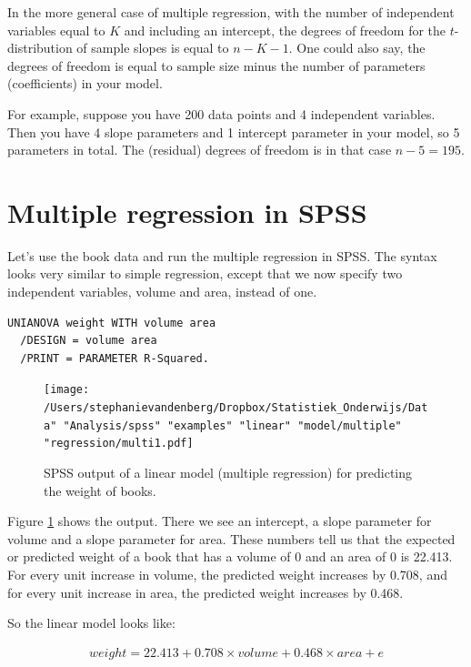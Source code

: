 \documentclass[]{book}\usepackage[]{graphicx}\usepackage[]{color}
\begin{document}
In the more general case of multiple regression, with the number of independent variables equal to $K$ and including an intercept, the degrees of freedom for the $t$-distribution of sample slopes is equal to $n-K-1$. One could also say, the degrees of freedom is equal to sample size minus the number of parameters (coefficients) in your model.

For example, suppose you have 200 data points and 4 independent variables. Then you have 4 slope parameters and 1 intercept parameter in your model, so 5 parameters in total. The (residual) degrees of freedom is in that case $n-5=195$.




\section{Multiple regression in SPSS}

Let's use the book data and run the multiple regression in SPSS. The syntax looks very similar to simple regression, except that we now specify two independent variables, volume and area, instead of one.

\begin{verbatim}
UNIANOVA weight WITH volume area
  /DESIGN = volume area
  /PRINT = PARAMETER R-Squared.
\end{verbatim}


\begin{figure}[h]
    \begin{center}
       \texttt{[image: /Users/stephanievandenberg/Dropbox/Statistiek\_Onderwijs/Data" "Analysis/spss" "examples" "linear" "model/multiple" "regression/multi1.pdf]}
    \end{center}
     \caption{SPSS output of a linear model (multiple regression) for predicting the weight of books.}
    \label{fig:multi1}
\end{figure}


Figure \ref{fig:multi1} shows the output. There we see an intercept, a slope parameter for volume and a slope parameter for area. These numbers tell us that the expected or predicted weight of a book that has a volume of 0 and an area of 0 is 22.413. For every unit increase in volume, the predicted weight increases by 0.708, and for every unit increase in area, the predicted weight increases by 0.468.

So the linear model looks like:


\begin{eqnarray}
weight =  22.413 + 0.708 \times volume + 0.468 \times area + e
\end{eqnarray}
\end{document}

